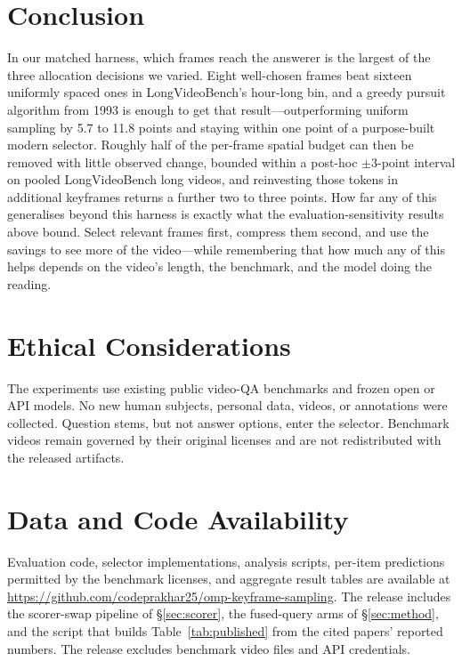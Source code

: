 \documentclass[11pt]{article}
\begin{document}
\section{Conclusion}
\label{sec:conclusion}

In our matched harness, which frames reach the answerer is the largest of the three allocation decisions we varied.
Eight well-chosen frames beat sixteen uniformly spaced ones in LongVideoBench's hour-long bin, and a greedy pursuit algorithm from 1993 is enough to get that result---outperforming uniform sampling by 5.7 to 11.8 points and staying within one point of a purpose-built modern selector.
Roughly half of the per-frame spatial budget can then be removed with little observed change, bounded within a post-hoc $\pm3$-point interval on pooled LongVideoBench long videos, and reinvesting those tokens in additional keyframes returns a further two to three points.
How far any of this generalises beyond this harness is exactly what the evaluation-sensitivity results above bound.
Select relevant frames first, compress them second, and use the savings to see more of the video---while remembering that how much any of this helps depends on the video's length, the benchmark, and the model doing the reading.

\section{Ethical Considerations}
\label{sec:ethics}

The experiments use existing public video-QA benchmarks and frozen open or API models.
No new human subjects, personal data, videos, or annotations were collected.
Question stems, but not answer options, enter the selector.
Benchmark videos remain governed by their original licenses and are not redistributed with the released artifacts.

\section{Data and Code Availability}

Evaluation code, selector implementations, analysis scripts, per-item predictions permitted by the benchmark licenses, and aggregate result tables are available at \url{https://github.com/codeprakhar25/omp-keyframe-sampling}.
The release includes the scorer-swap pipeline of \S\ref{sec:scorer}, the fused-query arms of \S\ref{sec:method}, and the script that builds Table~\ref{tab:published} from the cited papers' reported numbers.
The release excludes benchmark video files and API credentials.
\end{document}
